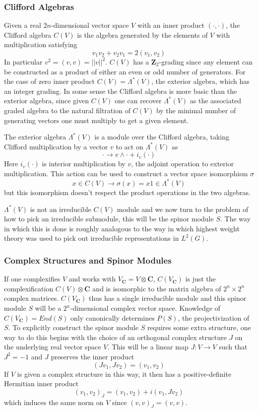 \documentclass[a4paper,a4paper]{article}
\theoremstyle{conjecture}
\begin{document}
\subsubsection{Clifford Algebras}

Given a real $2n$-dimensional vector space $V$ with an inner product $(\cdot,\cdot)$, the Clifford
algebra $C(V)$ is the algebra generated by the elements of $V$ with multiplication
satisfying
$$v_1v_2+v_2v_1=2(v_1,v_2)$$
In particular $v^2=(v,v)=||v||^2$.  $C(V)$ has a $\mathbf
Z_2$-grading since any element can be constructed as a product of
either an even or odd number of generators. For the case of zero
inner product $C(V)=\Lambda^*(V)$, the exterior algebra, which has
an integer grading.  In some sense the Clifford algebra is more
basic than the exterior algebra, since given $C(V)$ one can
recover $\Lambda^*(V)$ as the associated graded algebra to the
natural filtration of $C(V)$ by the minimal number of generating
vectors one must multiply to get a given element.

The exterior algebra $\Lambda^*(V)$ is a module over the Clifford algebra, taking
Clifford multiplication by a vector $v$
to act on $\Lambda^*(V)$ as
$$\cdot \rightarrow v\wedge\cdot + i_v(\cdot)$$
Here $i_v(\cdot)$ is interior multiplication by $v$,
the adjoint operation to exterior multiplication.  This action can be used to construct
a vector space isomorphism $\sigma$
$$x\in C(V)\rightarrow \sigma(x)=x1\in\Lambda^*(V)$$
but this isomorphism doesn't respect the product operations in the two algebras.

$\Lambda^*(V)$ is not an irreducible $C(V)$ module and we now turn to the problem
of how to pick an irreducible submodule, this will be the spinor module $S$.
The way in which this is done is roughly analogous to the way in which highest
weight theory was used to pick out irreducible representations in $L^2(G)$.

\subsubsection{Complex Structures and Spinor Modules}

If one complexifies $V$ and works with $V_{\mathbf C}=V\otimes
\mathbf C$, $C(V_{\mathbf C})$ is just the complexification
$C(V)\otimes\mathbf C$ and is isomorphic to the matrix algebra of
$2^n\times 2^n$ complex matrices. $C(V_\mathbf C)$ thus has a
single irreducible module and this spinor module $S$ will be a
$2^n$-dimensional complex vector space. Knowledge of $C(V_{\mathbf
C})=End(S)$ only canonically determines $P(S)$, the
projectivization of $S$. To explicitly construct the spinor module
$S$ requires some extra structure, one way to do this begins with
the choice of an orthogonal complex structure $J$ on the
underlying real vector space $V$.  This will be a linear map
$J:V\rightarrow V$ such that $J^2=-1$ and $J$ preserves the inner
product
$$(Jv_1,Jv_2)=(v_1,v_2)$$
If $V$ is given a complex structure in this way, it then has a positive-definite Hermitian inner
product
$$(v_1,v_2)_J=(v_1,v_2) + i(v_1,Jv_2)$$
which induces the same norm on $V$ since $(v,v)_J=(v,v)$.
\end{document}

